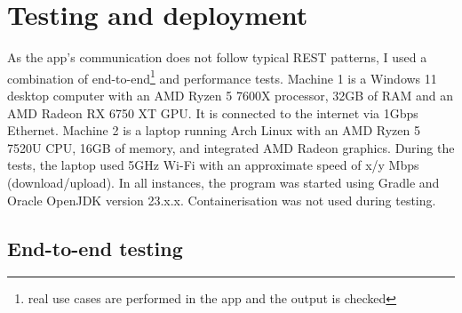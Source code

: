 \chapter{Testing and deployment}

As the app's communication does not follow typical REST patterns, I used a combination of end-to-end\footnote{real use cases are performed in the app and the output is checked} and performance tests.
Machine 1 is a Windows 11 desktop computer with an AMD Ryzen 5 7600X processor, 32GB of RAM and an AMD Radeon RX 6750 XT GPU. It is connected to the internet via 1Gbps Ethernet. Machine 2 is a laptop running Arch Linux with an AMD Ryzen 5 7520U CPU, 16GB of memory, and integrated AMD Radeon graphics. During the tests, the laptop used 5GHz Wi-Fi with an approximate speed of x/y Mbps (download/upload). In all instances, the program was started using Gradle and Oracle OpenJDK version 23.x.x. Containerisation was not used during testing.

\section{End-to-end testing}
